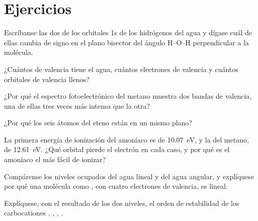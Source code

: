 \section{Ejercicios}

\begin{exercise}[$\star$]\label{exo:b2:fragment-orbitals:1}
Escríbanse las dos  de los orbitales 1s de los hidrógenos del
agua y dígase cuál de ellas cambia de signo en el plano bisector del ángulo H--O--H
perpendicular a la molécula.
\end{exercise}

\begin{exercise}[$\star$]\label{exo:b2:fragment-orbitals:2}
¿Cuántos  de valencia tiene el agua, cuántos electrones de valencia
y cuántos orbitales de valencia llenos?
\end{exercise}

\begin{exercise}[$\star$]\label{exo:b2:fragment-orbitals:3}
¿Por qué el espectro fotoelectrónico del metano muestra dos bandas de valencia, una de ellas
tres veces más intensa que la otra?
\end{exercise}

\begin{exercise}[$\star$]\label{exo:b2:fragment-orbitals:4}
¿Por qué los seis átomos del eteno están en un mismo plano?
\end{exercise}

\begin{exercise}[$\star\star$]\label{exo:b2:fragment-orbitals:5}
La primera energía de ionización del amoníaco es de \qty{10.07}{eV}, y la del metano, de
\qty{12.61}{eV}. ¿Qué orbital pierde el electrón en cada caso, y por qué es el amoníaco
el más fácil de ionizar?
\end{exercise}

\begin{exercise}[$\star\star$]\label{exo:b2:fragment-orbitals:6}
Compárense los niveles ocupados del agua lineal y del agua angular, y explíquese por qué una molécula
como , con cuatro electrones de valencia, es lineal.
\end{exercise}

\begin{exercise}[$\star\star$]\label{exo:b2:fragment-orbitals:7}
Explíquese, con el resultado de los dos niveles, el orden de estabilidad de los carbocationes
, , , .
\end{exercise}

